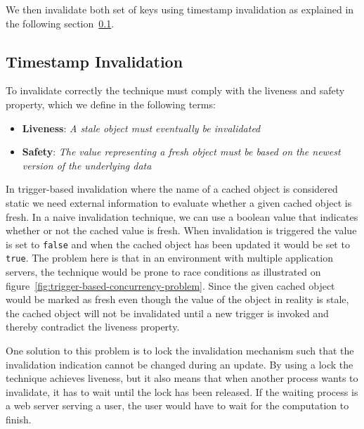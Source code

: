 We then invalidate both set of keys using timestamp invalidation as explained in the following section~\ref{subsec:timestamp-invalidation}.


\subsection{Timestamp Invalidation}
\label{subsec:timestamp-invalidation}

To invalidate correctly the technique must comply with the liveness and safety property, which we define in the following terms:

\begin{itemize}
  \item \textbf{Liveness}: \emph{A stale object must eventually be invalidated}
  \item \textbf{Safety}: \emph{The value representing a fresh object must be based on the newest version of the underlying data}
\end{itemize}

In trigger-based invalidation where the name of a cached object is considered static we need external information to evaluate whether a given cached object is fresh. In a naive invalidation technique, we can use a boolean value that indicates whether or not the cached value is fresh. When invalidation is triggered the value is set to \verb$false$ and when the cached object has been updated it would be set to \verb$true$. The problem here is that in an environment with multiple application servers, the technique would be prone to race conditions as illustrated on figure~\ref{fig:trigger-based-concurrency-problem}. Since the given cached object would be marked as fresh even though the value of the object in reality is stale, the cached object will not be invalidated until a new trigger is invoked and thereby contradict the liveness property.

One solution to this problem is to lock the invalidation mechanism such that the invalidation indication cannot be changed during an update. By using a lock the technique achieves liveness, but it also means that when another process wants to invalidate, it has to wait until the lock has been released. If the waiting process is a web server serving a user, the user would have to wait for the computation to finish.

